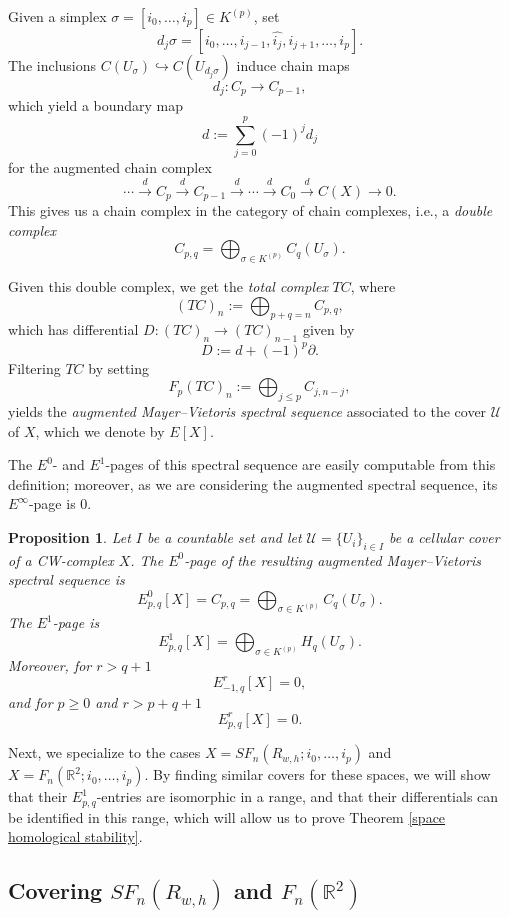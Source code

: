 \documentclass[pagebackref,colorlinks,citecolor=blue,linkcolor=blue,urlcolor=blue,filecolor=blue]{article}
\newtheorem{prop}[thm]{Proposition}
\theoremstyle{definition}\newtheorem{definition}[thm]{Definition}
\theoremstyle{definition}
\newcommand{\R}{\ensuremath{\mathbb{R}}}
\begin{document}
Given a simplex $\sigma=[i_{0}, \dots, i_{p}]\in K^{(p)}$, set
\[
d_{j}\sigma=[i_{0},\dots, i_{j-1}, \widehat{i_{j}},i_{j+1},\dots, i_{p}].
\]
The inclusions $C(U_{\sigma})\hookrightarrow C(U_{d_{j}\sigma})$ induce chain maps
\[
d_{j}:C_{p}\to C_{p-1},
\]
which yield a boundary map
\[
d:=\sum^{p}_{j=0}(-1)^{j}d_{j}
\]
for the augmented chain complex
\[
\cdots\xrightarrow{d} C_{p}\xrightarrow{d}C_{p-1}\xrightarrow{d}\cdots \xrightarrow{d}C_{0}\xrightarrow{d}C(X)\to 0.
\]
This gives us a chain complex in the category of chain complexes, i.e., a \emph{double complex}
\[
C_{p,q}=\bigoplus_{\sigma\in K^{(p)}}C_{q}(U_{\sigma}).
\]

Given this double complex, we get the \emph{total complex} $TC$, where
\[
(TC)_{n}:=\bigoplus_{p+q=n}C_{p,q},
\]
which has differential $D:(TC)_{n}\to (TC)_{n-1}$ given by
\[
D:=d+(-1)^{p}\partial.
\]
Filtering $TC$ by setting
\[
F_{p}(TC)_{n}:=\bigoplus_{j\le p}C_{j, n-j},
\]
yields the \emph{augmented Mayer--Vietoris spectral sequence} associated to the cover $\mathcal{U}$ of $X$, which we denote by $E[X]$.

The $E^{0}$- and $E^{1}$-pages of this spectral sequence are easily computable from this definition; moreover, as we are considering the augmented spectral sequence, its $E^{\infty}$-page is $0$.

\begin{prop}\label{E0E1EinftyMV}
Let $I$ be a countable set and let $\mathcal{U}=\{U_{i}\}_{i\in I}$ be a cellular cover of a CW-complex $X$.
The $E^{0}$-page of the resulting augmented Mayer--Vietoris spectral sequence is
\[
E^{0}_{p,q}[X]=C_{p,q}=\bigoplus_{\sigma\in K^{(p)}}C_{q}(U_{\sigma}).
\]
The $E^{1}$-page is
\[
E^{1}_{p,q}[X]=\bigoplus_{\sigma\in K^{(p)}} H_{q}(U_{\sigma}).
\]
Moreover, for $r> q+1$
\[
E^{r}_{-1,q}[X]=0, 
\]
and for $p\ge 0$ and $r>p+q+1$
\[
E^{r}_{p,q}[X]=0.
\]
\end{prop}

Next, we specialize to the cases $X=SF_{n}(R_{w,h}; i_{0}, \dots, i_{p})$ and $X=F_{n}(\R^{2}; i_{0}, \dots, i_{p})$.
By finding similar covers for these spaces, we will show that their $E^{1}_{p,q}$-entries are isomorphic in a range, and that their differentials can be identified in this range, which will allow us to prove Theorem \ref{space homological stability}.

\subsection{Covering $SF_{n}(R_{w,h})$ and $F_{n}(\R^{2})$}\label{our mv ss}
\end{document}
